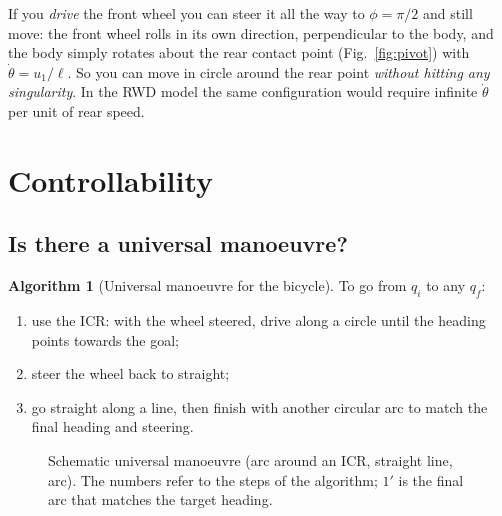 \documentclass[11pt,a4paper]{article}
\theoremstyle{plain}
\theoremstyle{definition}
\newtheorem{algorithm}[theorem]{Algorithm}
\theoremstyle{remark}
\newcommand{\wheel}[3]{\begin{scope}[shift={#1},rotate=#2]
  \draw[fill=#3,rounded corners=1pt] (-0.4,-0.12) rectangle (0.4,0.12);\end{scope}}
\begin{document}
\begin{intuition}
If you \emph{drive} the front wheel you can steer it all the way to $\phi=\pi/2$ and still move: the front wheel rolls in its own direction, perpendicular to the body, and the body simply rotates about the rear contact point (Fig.~\ref{fig:pivot}) with $\dot\theta=u_1/\ell$. So you can move in circle around the rear point \emph{without hitting any singularity}. In the RWD model the same configuration would require infinite $\dot\theta$ per unit of rear speed.
\end{intuition}

\section{Controllability}

\subsection{Is there a universal manoeuvre?}

\begin{algorithm}[Universal manoeuvre for the bicycle]
To go from $q_i$ to any $q_f$:
\begin{enumerate}[label=(\arabic*)]
\item use the ICR: with the wheel steered, drive along a circle until the heading points towards the goal;
\item steer the wheel back to straight;
\item go straight along a line, then finish with another circular arc to match the final heading and steering.
\end{enumerate}
\end{algorithm}

\begin{figure}[H]
\centering
{}
\caption{Schematic universal manoeuvre (arc around an ICR, straight line, arc). The numbers refer to the steps of the algorithm; $1'$ is the final arc that matches the target heading.}
\end{figure}
\end{document}
